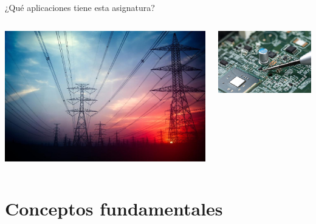 \documentclass[aspectratio=169, xcolor={usenames,svgnames,dvipsnames}]{beamer}
\begin{document}
\begin{frame}{¿Qué aplicaciones tiene esta asignatura?}
    \begin{columns}
    \begin{column}{0.4\columnwidth}
        \begin{center}
            \includegraphics[height=0.4\textheight]{../figs/power_lines.jpg}
        \end{center}
    \end{column}  
    \begin{column}{0.4\columnwidth}
        \begin{center}
            \includegraphics[height=0.4\textheight]{../figs/electronic_circuit.jpg}
        \end{center}
    \end{column}
    \end{columns}

\end{frame}



\section{Conceptos fundamentales}
\end{document}

